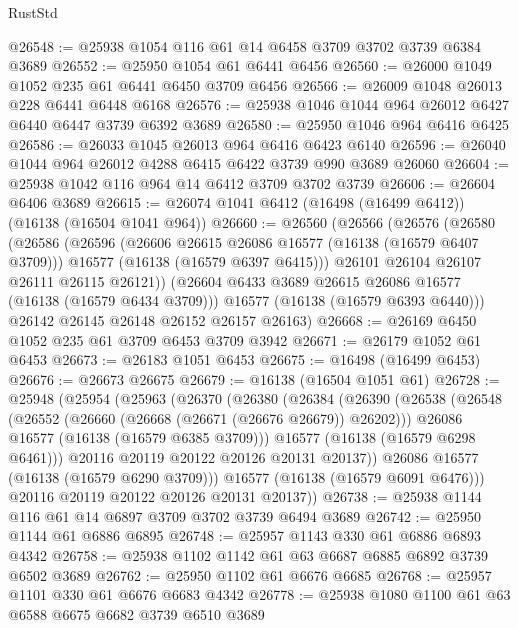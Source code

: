 \begin{lexlean}{RustStd}
\begin{coremodule}
@26548 := @25938 @1054 @116 @61 @14 @6458 @3709 @3702 @3739 @6384 @3689
@26552 := @25950 @1054 @61 @6441 @6456
@26560 := @26000 @1049 @1052 @235 @61 @6441 @6450 @3709 @6456
@26566 := @26009 @1048 @26013 @228 @6441 @6448 @6168
@26576 := @25938 @1046 @1044 @964 @26012 @6427 @6440 @6447 @3739 @6392 @3689
@26580 := @25950 @1046 @964 @6416 @6425
@26586 := @26033 @1045 @26013 @964 @6416 @6423 @6140
@26596 := @26040 @1044 @964 @26012 @4288 @6415 @6422 @3739 @990 @3689 @26060
@26604 := @25938 @1042 @116 @964 @14 @6412 @3709 @3702 @3739
@26606 := @26604 @6406 @3689
@26615 := @26074 @1041 @6412 (@16498 (@16499 @6412)) (@16138 (@16504 @1041 @964))
@26660 := @26560
    (@26566
      (@26576
        (@26580
          (@26586
            (@26596
              (@26606 @26615 @26086 @16577 (@16138 (@16579 @6407 @3709)))
              @16577
              (@16138 (@16579 @6397 @6415)))
            @26101
            @26104
            @26107
            @26111
            @26115
            @26121))
        (@26604 @6433 @3689 @26615 @26086 @16577 (@16138 (@16579 @6434 @3709)))
        @16577
        (@16138 (@16579 @6393 @6440)))
      @26142
      @26145
      @26148
      @26152
      @26157
      @26163)
@26668 := @26169 @6450 @1052 @235 @61 @3709 @6453 @3709 @3942
@26671 := @26179 @1052 @61 @6453
@26673 := @26183 @1051 @6453
@26675 := @16498 (@16499 @6453)
@26676 := @26673 @26675
@26679 := @16138 (@16504 @1051 @61)
@26728 := @25948
    (@25954
      (@25963
        (@26370
          (@26380
            (@26384
              (@26390
                (@26538
                  (@26548
                    (@26552 (@26660 (@26668 (@26671 (@26676 @26679)) @26202)))
                    @26086
                    @16577
                    (@16138 (@16579 @6385 @3709)))
                  @16577
                  (@16138 (@16579 @6298 @6461)))
                @20116
                @20119
                @20122
                @20126
                @20131
                @20137))
            @26086
            @16577
            (@16138 (@16579 @6290 @3709)))
          @16577
          (@16138 (@16579 @6091 @6476)))
        @20116
        @20119
        @20122
        @20126
        @20131
        @20137))
@26738 := @25938 @1144 @116 @61 @14 @6897 @3709 @3702 @3739 @6494 @3689
@26742 := @25950 @1144 @61 @6886 @6895
@26748 := @25957 @1143 @330 @61 @6886 @6893 @4342
@26758 := @25938 @1102 @1142 @61 @63 @6687 @6885 @6892 @3739 @6502 @3689
@26762 := @25950 @1102 @61 @6676 @6685
@26768 := @25957 @1101 @330 @61 @6676 @6683 @4342
@26778 := @25938 @1080 @1100 @61 @63 @6588 @6675 @6682 @3739 @6510 @3689

\end{coremodule}
\end{lexlean}
